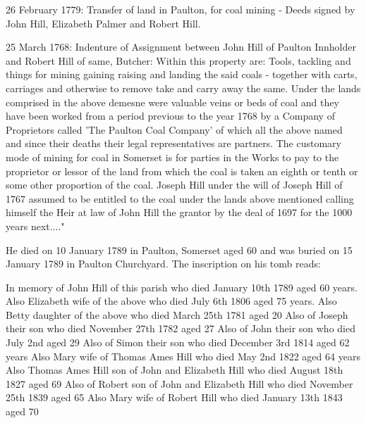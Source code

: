   26 February 1779:
Transfer of land in Paulton, for coal mining - Deeds signed by John Hill, Elizabeth Palmer and Robert Hill.

  25 March 1768: Indenture of Assignment between John Hill of Paulton Innholder and Robert Hill of same, Butcher:
Within this property are: Tools, tackling and things for mining gaining raising and landing the said coals - together with carts, carriages and otherwise to remove take and carry away the same.
Under the lands comprised in the above demesne were valuable veins or beds of coal and they have been worked from a period previous to the year 1768 by a Company of Proprietors called 'The Paulton Coal Company' of which all the above named and since their deaths their legal representatives are partners.
The customary mode of mining for coal in Somerset is for parties in the Works to pay to the proprietor or lessor of the land from which the coal is taken an eighth or tenth or some other proportion of the coal.
Joseph Hill under the will of Joseph Hill of 1767 assumed to be entitled to the coal under the lands above mentioned calling himself the Heir at law of John Hill the grantor by the deal of 1697 for the 1000 years next...."

He died on 10 January 1789 in Paulton, Somerset aged 60 and was buried on 15 January 1789 in Paulton Churchyard. The inscription on his tomb reads:

In memory of John Hill of this parish who died January 10th 1789 aged 60 years.
Also Elizabeth wife of the above who died July 6th 1806 aged 75 years.
Also Betty daughter of the above who died March 25th 1781 aged 20
Also of Joseph their son who died November 27th 1782 aged 27
Also of John their son who died July 2nd aged 29
Also of Simon their son who died December 3rd 1814 aged 62 years
Also Mary wife of Thomas Ames Hill who died May 2nd 1822 aged 64 years
Also Thomas Ames Hill son of John and Elizabeth Hill who died August 18th 1827 aged 69
Also of Robert son of John and Elizabeth Hill who died November 25th 1839 aged 65
Also Mary wife of Robert Hill who died January 13th 1843 aged 70



